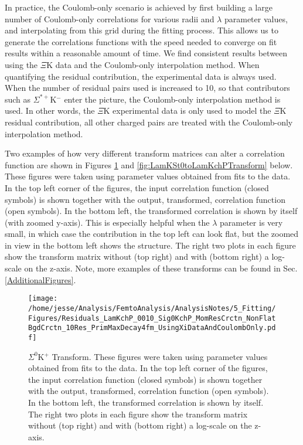 \documentclass[/home/jesse/Analysis/FemtoAnalysis/AnalysisNotes/AnalysisNoteJBuxton.tex]{subfiles}
\begin{document}
In practice, the Coulomb-only scenario is achieved by first building a large number of Coulomb-only correlations for various radii and $\lambda$ parameter values, and interpolating from this grid during the fitting process.
This allows us to generate the correlations functions with the speed needed to converge on fit results within a reasonable amount of time.  
We find consistent results between using the $\Xi$K data and the Coulomb-only interpolation method.  
When quantifying the \XiKpm residual contribution, the experimental \XiKpm data is always used.  
When the number of residual pairs used is increased to 10, so that contributors such as $\Sigma^{*+}$K$^{-}$ enter the picture, the Coulomb-only interpolation method is used.  
In other words, the $\Xi$K experimental data is only used to model the $\Xi$K residual contribution, all other charged pairs are treated with the Coulomb-only interpolation method.

Two examples of how very different transform matrices can alter a correlation function are shown in Figures \ref{fig:Sig0KchPtoLamKchPTransform} and \ref{fig:LamKSt0toLamKchPTransform} below.  
These figures were taken using parameter values obtained from fits to the data.  
In the top left corner of the figures, the input correlation function (closed symbols) is shown together with the output, transformed, correlation function (open symbols).  
In the bottom left, the transformed correlation is shown by itself (with zoomed y-axis).  
This is especially helpful when the $\lambda$ parameter is very small, in which case the contribution in the top left can look flat, but the zoomed in view in the bottom left shows the structure.  
The right two plots in each figure show the transform matrix without (top right) and with (bottom right) a log-scale on the z-axis.  
Note, more examples of these transforms can be found in Sec. \ref{AdditionalFigures}.

\begin{figure}[h]
  \centering
  \texttt{[image: /home/jesse/Analysis/FemtoAnalysis/AnalysisNotes/5\_Fitting/Figures/Residuals\_LamKchP\_0010\_Sig0KchP\_MomResCrctn\_NonFlatBgdCrctn\_10Res\_PrimMaxDecay4fm\_UsingXiDataAndCoulombOnly.pdf]}
  \caption[$\Sigma^{0}$K$^{+}$ Transform]{$\Sigma^{0}$K$^{+}$ Transform.  These figures were taken using parameter values obtained from fits to the data.  In the top left corner of the figures, the input correlation function (closed symbols) is shown together with the output, transformed, correlation function (open symbols).  In the bottom left, the transformed correlation is shown by itself.  The right two plots in each figure show the transform matrix without (top right) and with (bottom right) a log-scale on the z-axis.}
  \label{fig:Sig0KchPtoLamKchPTransform}
\end{figure}
\end{document}
